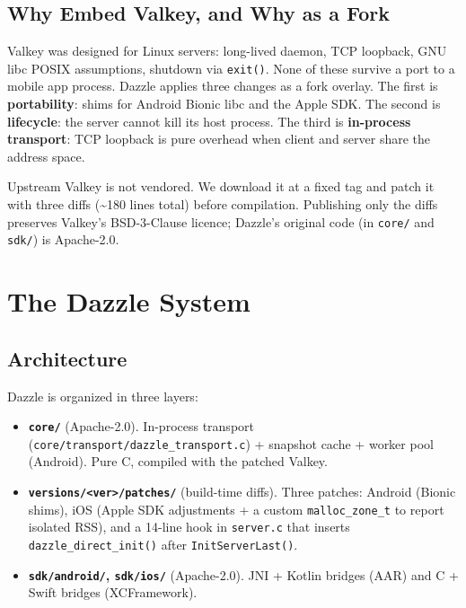 \subsection{Why Embed Valkey, and Why as a
Fork}\label{why-embed-valkey-and-why-as-a-fork}

Valkey was designed for Linux servers: long-lived daemon, TCP loopback, GNU libc
POSIX assumptions, shutdown via \texttt{exit()}. None of these survive a port to
a mobile app process. Dazzle applies three changes as a fork overlay. The first
is \textbf{portability}: shims for Android Bionic libc and the Apple SDK. The
second is \textbf{lifecycle}: the server cannot kill its host process. The third
is \textbf{in-process transport}: TCP loopback is pure overhead when client and
server share the address space.

Upstream Valkey is not vendored. We download it at a fixed tag and patch it with
three diffs (\textasciitilde180 lines total) before compilation. Publishing only
the diffs preserves Valkey's BSD-3-Clause licence; Dazzle's original code (in
\texttt{core/} and \texttt{sdk/}) is Apache-2.0.

\section{The Dazzle System}\label{the-dazzle-system}

\subsection{Architecture}\label{architecture}

Dazzle is organized in three layers:

\begin{itemize}
\tightlist
\item
  \textbf{\texttt{core/}} (Apache-2.0). In-process transport
  (\texttt{core/transport/dazzle\_transport.c}) + snapshot cache + worker pool
  (Android). Pure C, compiled with the patched Valkey.
\item
  \textbf{\texttt{versions/\textless{}ver\textgreater{}/patches/}} (build-time
  diffs). Three patches: Android (Bionic shims), iOS (Apple SDK adjustments + a
  custom \texttt{malloc\_zone\_t} to report isolated RSS), and a 14-line hook in
  \texttt{server.c} that inserts \texttt{dazzle\_direct\_init()} after
  \texttt{InitServerLast()}.
\item
  \textbf{\texttt{sdk/android/}, \texttt{sdk/ios/}} (Apache-2.0). JNI + Kotlin
  bridges (AAR) and C + Swift bridges (XCFramework).
\end{itemize}

